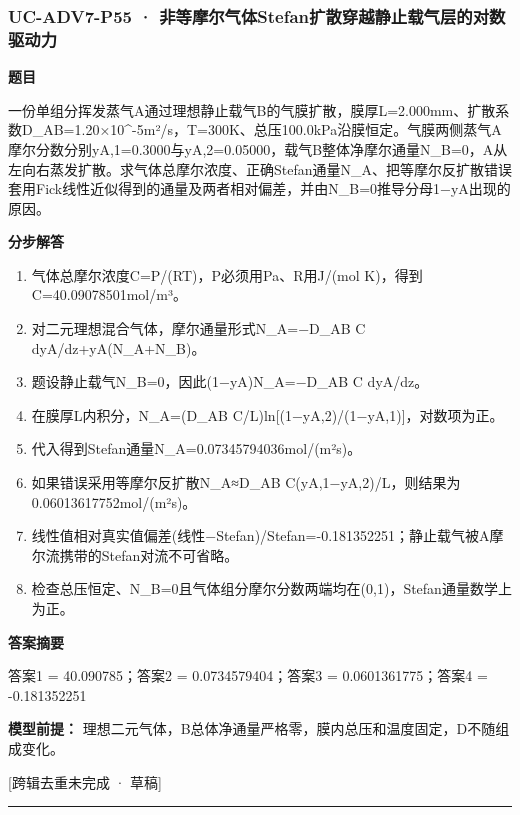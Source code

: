 \documentclass[UTF8,11pt,a4paper]{ctexart}
\begin{document}
\subsubsection*{UC-ADV7-P55 · 非等摩尔气体Stefan扩散穿越静止载气层的对数驱动力}
\noindent\textbf{题目}\par
一份单组分挥发蒸气A通过理想静止载气B的气膜扩散，膜厚L=2.000mm、扩散系数D\_AB=1.20×10\textasciicircum{}-5m²/s，T=300K、总压100.0kPa沿膜恒定。气膜两侧蒸气A摩尔分数分别yA,1=0.3000与yA,2=0.05000，载气B整体净摩尔通量N\_B=0，A从左向右蒸发扩散。求气体总摩尔浓度、正确Stefan通量N\_A、把等摩尔反扩散错误套用Fick线性近似得到的通量及两者相对偏差，并由N\_B=0推导分母1−yA出现的原因。\par
\medskip\noindent\textbf{分步解答}
\begin{enumerate}
\item 气体总摩尔浓度C=P/(RT)，P必须用Pa、R用J/(mol K)，得到C=40.09078501mol/m³。
\item 对二元理想混合气体，摩尔通量形式N\_A=−D\_AB C dyA/dz+yA(N\_A+N\_B)。
\item 题设静止载气N\_B=0，因此(1−yA)N\_A=−D\_AB C dyA/dz。
\item 在膜厚L内积分，N\_A=(D\_AB C/L)ln[(1−yA,2)/(1−yA,1)]，对数项为正。
\item 代入得到Stefan通量N\_A=0.07345794036mol/(m²s)。
\item 如果错误采用等摩尔反扩散N\_A≈D\_AB C(yA,1−yA,2)/L，则结果为0.06013617752mol/(m²s)。
\item 线性值相对真实值偏差(线性−Stefan)/Stefan=-0.181352251；静止载气被A摩尔流携带的Stefan对流不可省略。
\item 检查总压恒定、N\_B=0且气体组分摩尔分数两端均在(0,1)，Stefan通量数学上为正。
\end{enumerate}
\noindent\textbf{答案摘要}\par
答案1 = 40.090785；答案2 = 0.0734579404；答案3 = 0.0601361775；答案4 = -0.181352251\par
\noindent\textbf{模型前提：}
理想二元气体，B总体净通量严格零，膜内总压和温度固定，D不随组成变化。\par
\noindent\textcolor{red!65!black}{[跨辑去重未完成 · 草稿]} \par
\medskip\hrule\medskip
{}
\end{document}
